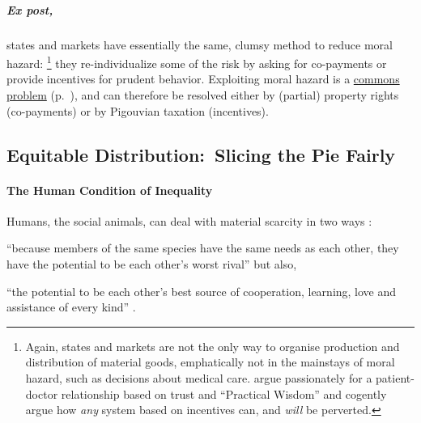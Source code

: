 \subparagraph{Ex post,}
states and markets have essentially the same, clumsy method to reduce moral hazard:
\footnote{
	Again, states and markets are not the only way to organise production and distribution of material goods, emphatically not in the mainstays of moral hazard, such as decisions about medical care.
	\cite{Schwartz2010} argue passionately for a patient-doctor relationship based on trust and ``Practical Wisdom'' and cogently argue how \emph{any} system based on incentives can, and \emph{will} be perverted.
}
they re-individualize some of the risk by asking for co-payments or provide incentives for prudent behavior.
Exploiting moral hazard is a \hyperref[sec:common-good]{commons problem} (p.~\pageref{sec:common-good}), and can therefore be resolved either by (partial) property rights (co-payments) or by Pigouvian taxation (incentives).

\subsection[Equitable Distribution]{Equitable Distribution:\ Slicing the Pie Fairly}
	\label{sec:distribution}

\paragraph{The Human Condition of Inequality}
	\label{sec:human-nature-of-inequality}
Humans, the social animals, can deal with material scarcity in two ways \citep{Pickett-2009-kx}:
\begin{inparaenum}
	\item ``because members of the same species have the same needs as each other, they have the potential to be each other's worst rival'' \citeyearpar[197]{Pickett-2009-kx} but also,
	\item ``the potential to be each other's best source of cooperation, learning, love and assistance of every kind'' \citeyearpar[198]{Pickett-2009-kx}.
\end{inparaenum}

